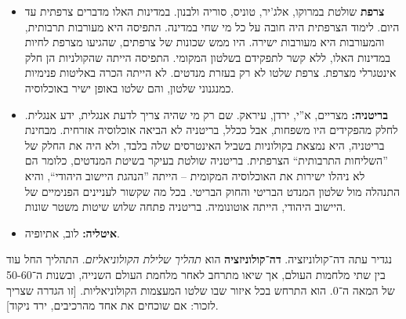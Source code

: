 \documentclass[]{../../../../tex/classes/styledArticle}
\begin{document}
	\begin{itemize}
		\item \textbf{צרפת} שולטת במרוקו, אלג'יר, טוניס, סוריה ולבנון. במדינות האלו מדברים צרפתית עד היום. לימוד הצרפתית היה חובה על כל מי שחי במדינה. התפיסה היא מעורבות תרבותית, והמעורבות היא מעורבות ישירה. היו ממש שכונות של צרפתים, שהגיעו מצרפת לחיות במדינות האלו, ללא קשר לתפקידם בשלטון המקומי. התפיסה הייתה שהקולניות הן חלק אינטגרלי מצרפת. צרפת שלטו לא רק בעזרת מנדטים. לא הייתה הכרה באליטות פנימיות כמנגנוני שלטון, והם שלטו באופן ישיר באוכלוסיה. 
		\item \textbf{בריטניה: }מצריים, א''י, ירדן, עיראק. שם רק מי שהיה צריך לדעת אנגלית, ידע אנגלית. לחלק מהפקידים היו משפחות, אבל ככלל, בריטניה לא הביאה אוכלוסיה אזרחית. מבחינת בריטניה, היא נמצאת בקולוניות בשביל האינטרסים שלה בלבד, ולא היה את החלק של ''השליחות התרבותית`` הצרפתית. בריטניה שולטת בעיקר בשיטת המנדטים, כלומר הם לא ניהלו ישירות את האוכלוסיה המקומית – הייתה ''הנהגת היישוב היהודי``, והיא התנהלה מול שלטון המנדט הבריטי והחוק הבריטי. בכל מה שקשור לעניינים הפנימיים של היישוב היהודי, הייתה אוטונומיה. בריטניה פתחה שלוש שיטות משטר שונות. 
		\item \textbf{איטליה: }לוב, אתיופיה. 
	\end{itemize}
	
	נגדיר עתה דה־קולוניזציה. \textbf{דה־קולוניזציה} הוא \textit{תהליך שלילת הקולוניאליזם}. התהליך החל עוד בין שתי מלחמות העולם, אך שיאו מתרחב לאחר מלחמת העולם השנייה, ובשנות ה־50-60 של המאה ה־0. הוא התרחש בכל איזור שבו שלטו המעצמות הקולוניאליות. [זו הגדרה שצריך לזכור: אם שוכחים את אחד מהרכיבים, ירד ניקוד]. 
	
\end{document}
